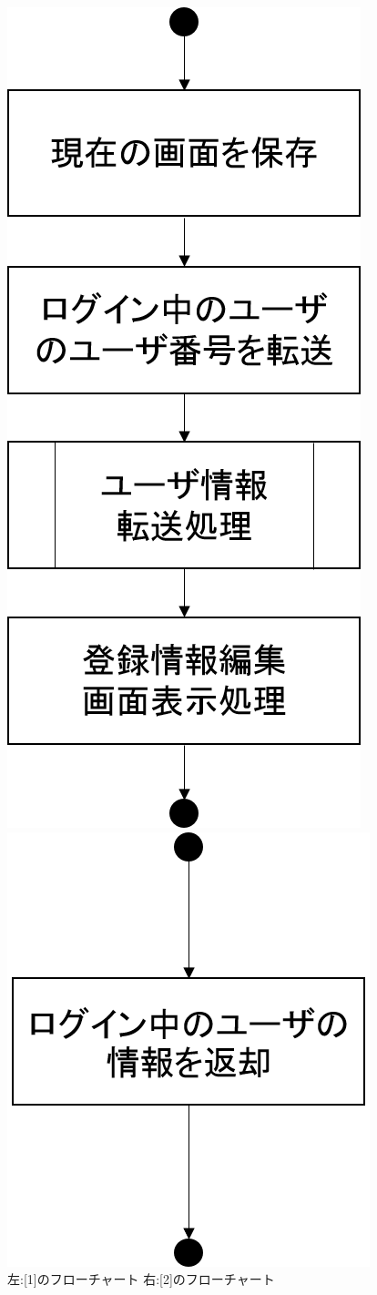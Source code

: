 \begin{figure}[htbp]
 \begin{minipage}{0.5\hsize}
  \begin{center}
   \includegraphics[width=0.5\linewidth,clip]{./img/edit_account/sub1.png}
  \end{center}
 \end{minipage}
 \begin{minipage}{0.5\hsize}
  \begin{center}
   \includegraphics[width=0.5\linewidth,clip]{./img/edit_account/sub2.png}
  \end{center}
 \end{minipage}
 \caption{左:[1]のフローチャート 右:[2]のフローチャート}\label{fig:editaccountflow0}
\end{figure}


